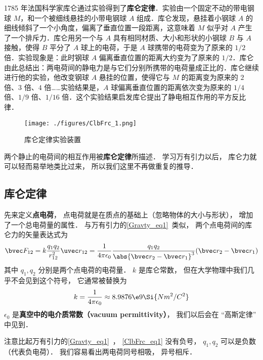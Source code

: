 
\begin{issues}
\issueDraft
\end{issues}


1785 年法国科学家库仑通过实验得到了\textbf{库仑定律}．实验由一个固定不动的带电钢球 $M$，和一个被细线悬挂的小带电钢球 $A$ 组成．库仑发现，悬挂着小钢球 $A$ 的细线倾斜了一个小角度，偏离了垂直位置一段距离，这意味着 $M$ 似乎对 $A$ 产生了一个排斥力．库仑用另一个与 $A$ 具有相同材质、大小和形状的小钢球 $B$ 与 $A$ 接触，使得 $B$ 平分了 $A$ 球上的电荷，于是 $A$ 球携带的电荷变为了原来的 $1/2$ 倍．实验现象是：此时钢球 $A$ 偏离垂直位置的距离大约变为了原来的 $1/2$．库仑由此总结出：两电荷间的静电力是与它们分别所携带的电荷量成正比的．库仑继续进行他的实验，他改变钢球 $A$ 悬挂的位置，使得它与 $M$ 的距离变为原来的 $2$ 倍、$3$ 倍、$4$ 倍……实验结果是，$A$ 球偏离垂直位置的距离依次变为原来的 $1/4$ 倍、$1/9$ 倍、$1/16$ 倍．这个实验结果启发库仑提出了静电相互作用的平方反比律．
\begin{figure}[ht]
\centering
\texttt{[image: ./figures/ClbFrc\_1.png]}
\caption{库仑定律实验装置} \label{ClbFrc_fig1}
\end{figure}

两个静止的电荷间的相互作用被\textbf{库仑定律}所描述．
学习万有引力以后， 库仑力就可以轻而易举地类比过来， 所以我们这里不再做重复的推导．

\subsection{库仑定律}
先来定义\textbf{点电荷}， 点电荷就是在质点的基础上（忽略物体的大小与形状）， 增加了一个总电荷量的属性． 与万有引力的\autoref{Gravty_eq1}~类似， 两个点电荷间的库仑力的矢量表达式为
\begin{equation}\label{ClbFrc_eq1}
\bvec F_{12} = k\frac{q_1 q_2}{r_{12}^2} \uvec r_{12} = \frac{1}{4\pi\epsilon_0} \frac{q_1 q_2}{\abs{\bvec r_2 - \bvec r_1}^3}(\bvec r_2 - \bvec r_1)
\end{equation}
其中 $q_1, q_2$ 分别是两个点电荷的电荷量． $k$ 是库仑常数， 但在大学物理中我们几乎不会见到这个符号， 它通常被替换为
\begin{equation}
k = \frac{1}{4\pi\epsilon_0} \approx 8.9876\e9 \Si{N m^2/C^2}
\end{equation}
$\epsilon_0$ 是\textbf{真空中的电介质常数（vacuum permittivity）}， 我们以后会在 “高斯定律” 中见到．

注意比起万有引力的\autoref{Gravty_eq1}~， \autoref{ClbFrc_eq1} 没有负号， $q_1, q_2$ 可以是负数（代表负电荷）． 我们容易看出两电荷同号相吸， 异号相斥．
